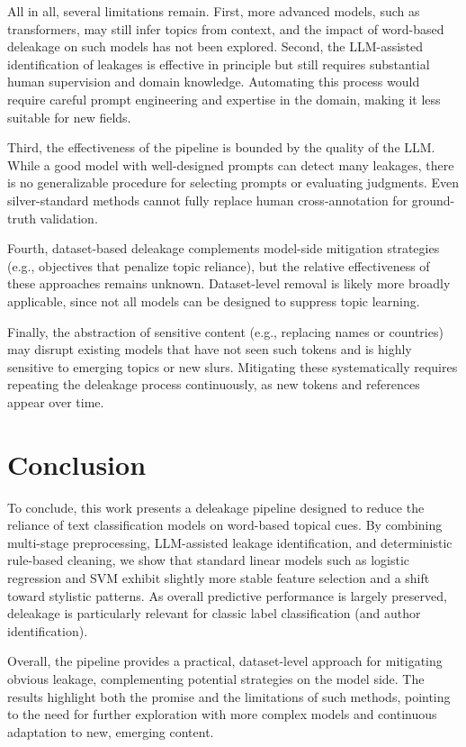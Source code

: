 \documentclass[11pt]{article}
\begin{document}
All in all, several limitations remain. First, more advanced models, such as transformers, may still infer topics from context, and the impact of word-based deleakage on such models has not been explored. Second, the LLM-assisted identification of leakages is effective in principle but still requires substantial human supervision and domain knowledge. Automating this process would require careful prompt engineering and expertise in the domain, making it less suitable for new fields.

Third, the effectiveness of the pipeline is bounded by the quality of the LLM. While a good model with well-designed prompts can detect many leakages, there is no generalizable procedure for selecting prompts or evaluating judgments. Even silver-standard methods cannot fully replace human cross-annotation for ground-truth validation.

Fourth, dataset-based deleakage complements model-side mitigation strategies (e.g., objectives that penalize topic reliance), but the relative effectiveness of these approaches remains unknown. Dataset-level removal is likely more broadly applicable, since not all models can be designed to suppress topic learning.

Finally, the abstraction of sensitive content (e.g., replacing names or countries) may disrupt existing models that have not seen such tokens and is highly sensitive to emerging topics or new slurs. Mitigating these systematically requires repeating the deleakage process continuously, as new tokens and references appear over time.

\section{Conclusion}
To conclude, this work presents a deleakage pipeline designed to reduce the reliance of text classification models on word-based topical cues. By combining multi-stage preprocessing, LLM-assisted leakage identification, and deterministic rule-based cleaning, we show that standard linear models such as logistic regression and SVM exhibit slightly more stable feature selection and a shift toward stylistic patterns. As overall predictive performance is largely preserved, deleakage is particularly relevant for classic label classification (and author identification).

Overall, the pipeline provides a practical, dataset-level approach for mitigating obvious leakage, complementing potential strategies on the model side. The results highlight both the promise and the limitations of such methods, pointing to the need for further exploration with more complex models and continuous adaptation to new, emerging content.
\end{document}
